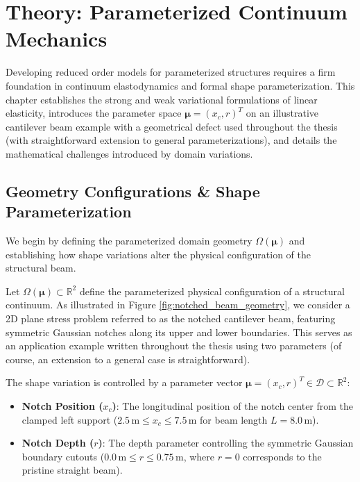 \chapter{Theory: Parameterized Continuum Mechanics}
\label{ch:theory}



Developing reduced order models for parameterized structures requires a firm foundation in continuum elastodynamics and formal shape parameterization. This chapter establishes the strong and weak variational formulations of linear elasticity, introduces the parameter space $\boldsymbol{\mu} = (x_c, r)^T$ on an illustrative cantilever beam example with a geometrical defect used throughout the thesis (with straightforward extension to general parameterizations), and details the mathematical challenges introduced by domain variations.

\section{Geometry Configurations \& Shape Parameterization}

We begin by defining the parameterized domain geometry $\Omega(\boldsymbol{\mu})$ and establishing how shape variations alter the physical configuration of the structural beam.

Let $\Omega(\boldsymbol{\mu}) \subset \mathbb{R}^2$ define the parameterized physical configuration of a structural continuum. As illustrated in Figure \ref{fig:notched_beam_geometry}, we consider a 2D plane stress problem referred to as the notched cantilever beam, featuring symmetric Gaussian notches along its upper and lower boundaries. This serves as an application example written throughout the thesis using two parameters (of course, an extension to a general case is straightforward).

The shape variation is controlled by a parameter vector $\boldsymbol{\mu} = (x_c, r)^T \in \mathcal{D} \subset \mathbb{R}^2$:
\begin{itemize}[leftmargin=*]
    \item \textbf{Notch Position ($x_c$)}: The longitudinal position of the notch center from the clamped left support ($2.5\,\text{m} \le x_c \le 7.5\,\text{m}$ for beam length $L = 8.0\,\text{m}$).
    \item \textbf{Notch Depth ($r$)}: The depth parameter controlling the symmetric Gaussian boundary cutouts ($0.0\,\text{m} \le r \le 0.75\,\text{m}$, where $r = 0$ corresponds to the pristine straight beam).
\end{itemize}

